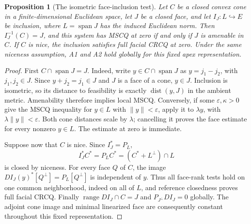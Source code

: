 \documentclass[11pt]{article}
\numberwithin{equation}{section}
\newtheorem{proposition}[theorem]{Proposition}
\theoremstyle{definition}
\theoremstyle{remark}
\DeclareMathOperator{\dist}{dist}
\DeclareMathOperator{\spann}{span}
\DeclareMathOperator{\range}{range}
\newcommand{\norm}[1]{\lVert #1\rVert}
\newcommand{\dset}[2]{\dist(#1,#2)}
\begin{document}
\begin{proposition}[The isometric face-inclusion test]
\label{prop:inclusion}
Let $C$ be a closed convex cone in a finite-dimensional Euclidean space,
let $J$ be a closed face, and let $I_J:L\hookrightarrow E$ be inclusion,
where $L=\spann J$ has the induced Euclidean norm. Then
$I_J^{-1}(C)=J$, and this system has MSCQ at zero if and only if $J$ is
amenable in $C$. If $C$ is nice, the inclusion satisfies full facial
CRCQ at zero. Under the same niceness assumption, A1 and A2 hold globally
for this fixed apex representation.
\end{proposition}
\begin{proof}
First $C\cap\spann J=J$. Indeed, write $y\in C\cap\spann J$ as
$y=j_1-j_2$, with $j_1,j_2\in J$. Since $y+j_2=j_1\in J$ and $J$
is a face of a cone, $y\in J$. Inclusion is isometric, so its distance
to feasibility is exactly $\dset{y}{J}$ in the ambient metric.
Amenability therefore implies local MSCQ. Conversely, if some
$\varepsilon,\kappa>0$ give the MSCQ inequality for $y\in L$ with
$\norm{y}<\varepsilon$, apply it to $\lambda y$, with
$\lambda\norm{y}<\varepsilon$. Both cone distances scale by $\lambda$;
cancelling it proves the face estimate for every nonzero $y\in L$.
The estimate at zero is immediate.

Suppose now that $C$ is nice. Since $I_J^*=P_L$,
\begin{equation}
 I_J^*C^*=P_LC^*=(C^*+L^\perp)\cap L
 \label{eq:inclusion-image}
\end{equation}
is closed by niceness. For every face $Q$ of $C$, the image
$DI_J(y)^*[Q^\perp]=P_L[Q^\perp]$ is independent of $y$.
Thus all face-rank tests hold on one common neighborhood, indeed on
all of $L$, and reference closedness proves full facial CRCQ.
Finally $\range DI_J\cap C=J$ and $P_{J^\perp}DI_J=0$ globally.
The adjoint cone image and minimal linearized face are consequently
constant throughout this fixed representation.
\end{proof}
\end{document}
